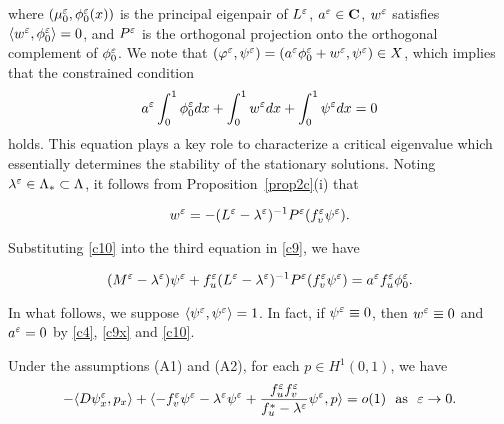 \documentclass[a4,10pt]{article}
\begin{document}
\no
where $(\mu_0^\varepsilon, \phi_0^\varepsilon(x))$ is the principal eigenpair of
$L^\varepsilon$, $a^\varepsilon \in \mbox{\bf C}$, $w^\varepsilon$ satisfies $\langle w^\varepsilon, 
\phi_0^\varepsilon \rangle =0$, and $P^\varepsilon$ is the orthogonal projection
onto the orthogonal complement of $\phi_0^\varepsilon$. 
We note that $(\varphi^\varepsilon, \psi^\varepsilon) = ( a^\varepsilon \phi_0^\varepsilon + w^\varepsilon, \psi^\varepsilon) \in X$, which implies 
that the constrained condition
%
\begin{equation}\label{c9x}
a^\varepsilon \int_0^1 \phi_0^\varepsilon dx + \int_0^1 w^\varepsilon dx  +   \int_0^1 \psi^\varepsilon dx = 0
\end{equation}
%
holds. This equation plays a key role to characterize a critical eigenvalue
which essentially determines the stability of the stationary solutions.
Noting $\lambda^\varepsilon \in \Lambda_* \subset \Lambda$, it follows from Proposition~\ref{prop2c}(i) that

\begin{equation}\label{c10}
w^\varepsilon = - ( L^\varepsilon - \lambda^\varepsilon )^{-1} P^\varepsilon(f_v^\varepsilon \psi^\varepsilon).
\end{equation}

\no
Substituting \eqref{c10} into the third equation in \eqref{c9}, we have

\begin{equation}\label{c11}
( M^\varepsilon - \lambda^\varepsilon) \psi^\varepsilon + f_u^\varepsilon ( L^\varepsilon - \lambda^\varepsilon )^{-1} P^\varepsilon(f_v^\varepsilon \psi^\varepsilon) = a^\varepsilon f_u^\varepsilon \phi^\varepsilon_0.
\end{equation}

In what follows, we suppose $\langle \psi^\varepsilon, \psi^\varepsilon \rangle = 1$. 
In fact, 
if $\psi^\varepsilon \equiv 0$, then
$w^\varepsilon \equiv 0$ and $a^\varepsilon =0$ by \eqref{c4}, \eqref{c9x} and \eqref{c10}.


\begin{lemma}\label{lem1c}
Under the assumptions (A1) and (A2),
for each $p \in H^1(0, 1)$, we have
%
\begin{equation}\label{c12}
- \langle D \psi^\varepsilon_{x}, p_x \rangle + \langle - f_v^\varepsilon \psi^\varepsilon - \lambda^\varepsilon \psi^\varepsilon
 + \frac{f_u^\varepsilon f_v^\varepsilon }{ f_u^* - \lambda^\varepsilon }\psi^\varepsilon, p \rangle = o(1)
\ \ \text{as} \ \ \varepsilon \to 0.
\end{equation}
%
\end{lemma}
\end{document}

